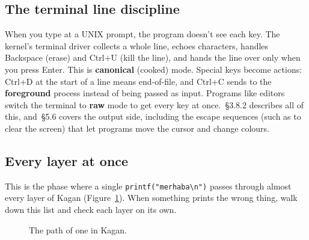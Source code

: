 \documentclass[11pt,a4paper]{article}
\begin{document}
\subsection{The terminal line discipline}

When you type at a UNIX prompt, the program doesn't see each key. The kernel's terminal driver collects a whole line,
echoes characters, handles Backspace (erase) and Ctrl+U (kill the line), and hands the line over only when you press
Enter. This is \textbf{canonical} (cooked) mode. Special keys become actions: Ctrl+D at the start of a line means
end-of-file, and Ctrl+C sends  to the \textbf{foreground} process instead of being passed as input.
Programs like editors switch the terminal to \textbf{raw} mode to get every key at once. \OSDI\,\S3.8.2 describes all
of this, and \MOS\,\S5.6 covers the output side, including the escape sequences (such as \code{ESC [2J} to clear the
screen) that let programs move the cursor and change colours.

\subsection{Every layer at once}

This is the phase where a single \texttt{printf("merhaba\textbackslash n")} passes through almost every layer of Kagan
(Figure~\ref{fig:layers}). When something prints the wrong thing, walk down this list and check each layer on its own.

\begin{figure}[htbp]
\centering
{}
\caption{The path of one  in Kagan.}
\label{fig:layers}
\end{figure}
\end{document}
